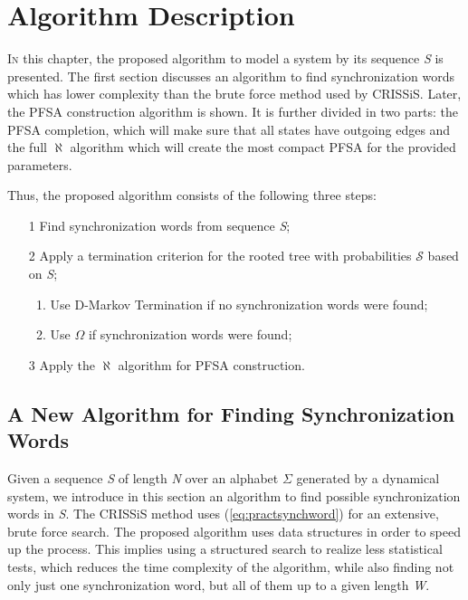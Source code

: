 \chapter{Algorithm Description}\label{cap:3}


{\lettrine[loversize=0.25,findent=0.2em,nindent=0em]{I}{n} this chapter, the proposed algorithm to model a system by its sequence \textit{S} is presented. The first section discusses an algorithm to find synchronization words which has lower complexity than the brute force method used by CRISSiS. Later, the PFSA construction algorithm is shown. It is further divided in two parts: the PFSA completion, which will make sure that all states have outgoing edges and the full $\aleph$ algorithm which will create the most compact PFSA for the provided parameters. 

Thus, the proposed algorithm consists of the following three steps: 


\begin{enumerate}
\item[1] Find synchronization words from sequence \textit{S};
\item[2] Apply a termination criterion for the rooted tree with probabilities $\mathcal{S}$ based on \textit{S};
	\begin{enumerate}
	\item Use D-Markov Termination if no synchronization words were found;
	\item Use $\Omega$ if synchronization words were found;
	\end{enumerate}
\item[3] Apply the $\aleph$ algorithm for PFSA construction.
\end{enumerate}

\section{A New Algorithm for Finding Synchronization Words}

Given a sequence \textit{S} of length \textit{N} over an alphabet $\Sigma$ generated by a dynamical system, we introduce in this section an algorithm to find possible synchronization words in \textit{S}. The CRISSiS method uses (\ref{eq:practsynchword}) for an extensive, brute force search.  The proposed algorithm uses data structures in order to speed up the process. This implies using a structured search to realize less statistical tests, which reduces the time complexity of the algorithm, while also finding not only just one synchronization word, but all of them up to a given length \textit{W}.

}
